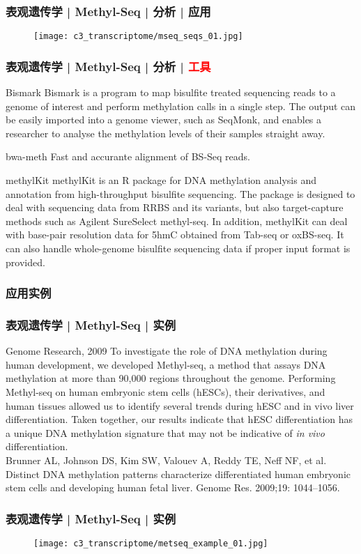 \begin{frame}
  \frametitle{表观遗传学 | Methyl-Seq | 分析 | 应用}
  \begin{figure}
    \centering
    \texttt{[image: c3\_transcriptome/mseq\_seqs\_01.jpg]}
  \end{figure}
\end{frame}

\begin{frame}
  \frametitle{表观遗传学 | Methyl-Seq | 分析 | \textcolor{red}{工具}}
  {\footnotesize
  \begin{block}{Bismark}
    Bismark is a program to map bisulfite treated sequencing reads to a genome of interest and perform methylation calls in a single step. The output can be easily imported into a genome viewer, such as SeqMonk, and enables a researcher to analyse the methylation levels of their samples straight away.
  \end{block}
  \pause
  \begin{block}{bwa-meth}
  Fast and accurante alignment of BS-Seq reads.
  \end{block}
  \pause
  \begin{block}{methylKit}
    methylKit is an R package for DNA methylation analysis and annotation from high-throughput bisulfite sequencing. The package is designed to deal with sequencing data from RRBS and its variants, but also target-capture methods such as Agilent SureSelect methyl-seq. In addition, methylKit can deal with base-pair resolution data for 5hmC obtained from Tab-seq or oxBS-seq. It can also handle whole-genome bisulfite sequencing data if proper input format is provided.
  \end{block}
  }
\end{frame}

\subsubsection{应用实例}
\begin{frame}
  \frametitle{表观遗传学 | Methyl-Seq | 实例}
  \begin{block}{Genome Research, 2009}
    To investigate the role of DNA methylation during human development, we developed Methyl-seq, a method that assays DNA methylation at more than 90,000 regions throughout the genome. Performing Methyl-seq on human embryonic stem cells (hESCs), their derivatives, and human tissues allowed us to identify several trends during hESC and in vivo liver differentiation. Taken together, our results indicate that hESC differentiation has a unique DNA methylation signature that may not be indicative of \textit{in vivo} differentiation.\\
    \vspace{0.5em}
    Brunner AL, Johnson DS, Kim SW, Valouev A, Reddy TE, Neff NF, et al. Distinct DNA methylation patterns characterize differentiated human embryonic stem cells and developing human fetal liver. Genome Res. 2009;19: 1044–1056.
  \end{block}
\end{frame}

\begin{frame}
  \frametitle{表观遗传学 | Methyl-Seq | 实例}
  \begin{figure}
    \centering
    \texttt{[image: c3\_transcriptome/metseq\_example\_01.jpg]}
  \end{figure}
\end{frame}

